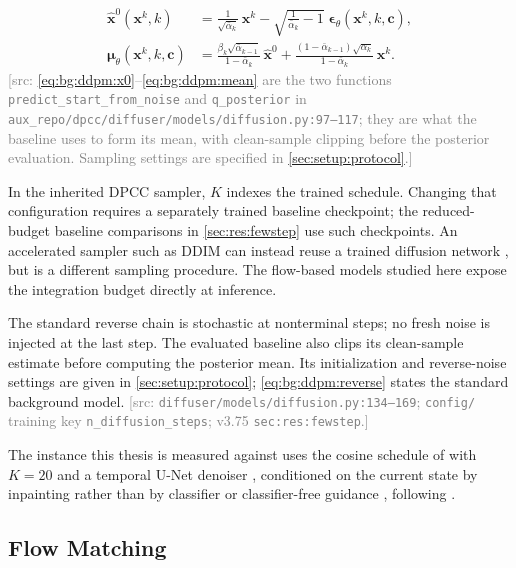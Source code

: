 \documentclass[headsepline,footsepline,footinclude=false,oneside,fontsize=11pt,paper=a4,listof=totoc,bibliography=totoc]{scrbook}
\theoremstyle{definition}
\theoremstyle{plain}
\theoremstyle{remark}
\newcommand{\vect}[1]{\boldsymbol{#1}}
\newcommand{\nfe}{K}                           %
\newif\ifsubmission
\newcommand{\srcnote}[1]{\ifsubmission\else\textcolor{gray}{\footnotesize\textsf{[src: #1]}}\fi}
\begin{document}
\begin{align}
  \hat{\vect{x}}^{0}\!\left(\vect{x}^{k},k\right)
    &= \tfrac{1}{\sqrt{\bar{\alpha}_{k}}}\,\vect{x}^{k}
       - \sqrt{\tfrac{1}{\bar{\alpha}_{k}}-1}\;\vect{\epsilon}_{\theta}\!\left(\vect{x}^{k},k,\vect{c}\right),
       \label{eq:bg:ddpm:x0} \\[2pt]
  \vect{\mu}_{\theta}\!\left(\vect{x}^{k},k,\vect{c}\right)
    &= \frac{\beta_{k}\sqrt{\bar{\alpha}_{k-1}}}{1-\bar{\alpha}_{k}}\,\hat{\vect{x}}^{0}
     + \frac{(1-\bar{\alpha}_{k-1})\sqrt{\alpha_{k}}}{1-\bar{\alpha}_{k}}\,\vect{x}^{k}.
       \label{eq:bg:ddpm:mean}
\end{align}
\srcnote{\eqref{eq:bg:ddpm:x0}--\eqref{eq:bg:ddpm:mean} are the two functions
\texttt{predict\_start\_from\_noise} and \texttt{q\_posterior} in
\texttt{aux\_repo/dpcc/diffuser/models/diffusion.py:97--117}; they are what the baseline
uses to form its mean, with clean-sample clipping before the posterior evaluation.
Sampling settings are specified in \autoref{sec:setup:protocol}.}

In the inherited DPCC sampler, $\nfe$ indexes the trained schedule. Changing that configuration
requires a separately trained baseline checkpoint; the reduced-budget baseline comparisons in
\autoref{sec:res:fewstep} use such checkpoints. An accelerated sampler such as DDIM can instead
reuse a trained diffusion network \parencite{song2021denoising}, but is a different sampling procedure.
The flow-based models studied here expose the integration budget directly at inference.

The standard reverse chain is stochastic at nonterminal steps; no fresh noise is injected at the
last step. The evaluated baseline also clips its clean-sample estimate before computing the
posterior mean. Its initialization and reverse-noise settings are given in
\autoref{sec:setup:protocol}; \eqref{eq:bg:ddpm:reverse} states the standard background model.
\srcnote{\texttt{diffuser/models/diffusion.py:134--169}; \texttt{config/} training key
\texttt{n\_diffusion\_steps}; v3.75 \texttt{sec:res:fewstep}.}

The instance this thesis is measured against uses the cosine schedule of
\parencite{nichol2021improved} with $\nfe = 20$ and a temporal U-Net denoiser
\parencite{janner2022planning}, conditioned on the current state by inpainting rather than by
classifier or classifier-free guidance \parencite{dhariwal2021diffusion,ho2022classifier}, following
\parencite[Sec.~6.1]{romer2025diffusion}.

\subsection{Flow Matching}\label{sec:method:fm}
\end{document}
